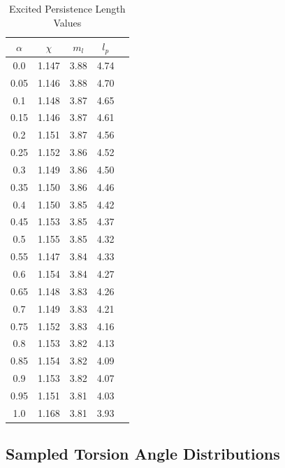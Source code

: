 \begin{table}[hbt!]\centering
\caption{Excited Persistence Length Values}
\label{tab:e_lp}
\renewcommand{\arraystretch}{1.5}
\begin{threeparttable}
\begin{tabular}{ccccc}\toprule
\multicolumn{1}{c}{\multirow{1}{3.5cm}{\centering $\alpha$}} &
\multicolumn{1}{c}{\multirow{1}{1.5cm}{\centering $\chi$}} &
\multicolumn{1}{c}{\multirow{1}{1.5cm}{\centering $m_l$}} &
\multicolumn{1}{c}{\multirow{1}{1.5cm}{\centering $l_p$}} & \\ \midrule
    0.0 & 1.147 & 3.88 & 4.74\\
    0.05 & 1.146 & 3.88 & 4.70\\
    0.1 & 1.148 & 3.87 & 4.65\\
    0.15 & 1.146 & 3.87 & 4.61\\
    0.2 & 1.151 & 3.87 & 4.56\\
    0.25 & 1.152 & 3.86 & 4.52\\
    0.3 & 1.149 & 3.86 & 4.50\\ \midrule
    0.35 & 1.150 & 3.86 & 4.46\\
    0.4 & 1.150 & 3.85 & 4.42\\
    0.45 & 1.153 & 3.85 & 4.37\\
    0.5 & 1.155 & 3.85 & 4.32\\
    0.55 & 1.147 & 3.84 & 4.33\\
    0.6 & 1.154 & 3.84 & 4.27\\
    0.65 & 1.148 & 3.83 & 4.26\\ \midrule
    0.7 & 1.149 & 3.83 & 4.21\\
    0.75 & 1.152 & 3.83 & 4.16\\
    0.8 & 1.153 & 3.82 & 4.13\\
    0.85 & 1.154 & 3.82 & 4.09\\
    0.9 & 1.153 & 3.82 & 4.07\\
    0.95 & 1.151 & 3.81 & 4.03\\
    1.0 & 1.168 & 3.81 & 3.93\\ \bottomrule
\end{tabular}
\begin{tablenotes}
\item
\end{tablenotes}
\end{threeparttable}
\end{table}

\clearpage
\subsection{Sampled Torsion Angle Distributions}

